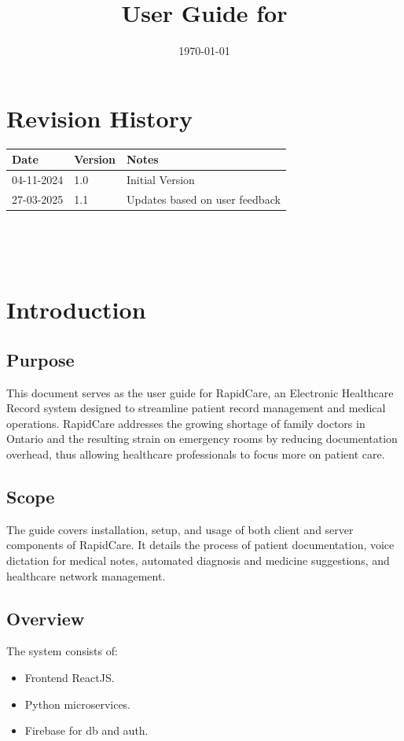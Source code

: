 \documentclass[12pt, titlepage]{article}
\title{User Guide for \progname{}}
\author{\authname}
\date{\today}
\begin{document}
\maketitle


\section*{Revision History}

\begin{tabularx}{\textwidth}{p{3cm}p{2cm}X}
\toprule {\bf Date} & {\bf Version} & {\bf Notes}\\
\midrule
04-11-2024 & 1.0 & Initial Version\\
27-03-2025 & 1.1 & Updates based on user feedback\\
\bottomrule
\end{tabularx}

~\newpage

\tableofcontents

\listoffigures

~\newpage


\section{Introduction}
\subsection{Purpose}
This document serves as the user guide for RapidCare, an Electronic Healthcare Record system designed to streamline patient record management and medical operations. RapidCare addresses the growing shortage of family doctors in Ontario and the resulting strain on emergency rooms by reducing documentation overhead, thus allowing healthcare professionals to focus more on patient care.

\subsection{Scope}
The guide covers installation, setup, and usage of both client and server components of RapidCare. It details the process of patient documentation, voice dictation for medical notes, automated diagnosis and medicine suggestions, and healthcare network management.

\subsection{Overview}
The system consists of:
\begin{itemize}
\item Frontend ReactJS.
\item Python microservices.
\item Firebase for db and auth.
\end{itemize}
\end{document}
